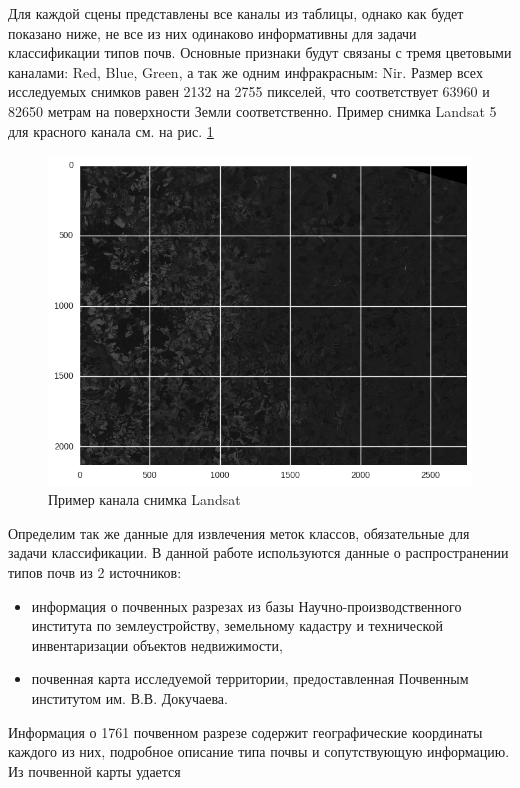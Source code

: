 \documentclass[14pt]{extarticle}
\begin{document}
\par
Для каждой сцены представлены все каналы из таблицы, однако как будет показано ниже, не 
все из них одинаково информативны для задачи классификации типов почв. Основные признаки
будут связаны с тремя цветовыми каналами: Red, Blue, Green, а так же одним инфракрасным: Nir.
Размер всех исследуемых снимков равен 2132 на 2755 пикселей, что соответствует
63960 и 82650 метрам на поверхности Земли соответственно. Пример снимка Landsat 5 для
красного канала см. на рис. \ref{image:landsat_example}
\begin{figure}[H]
\centering
\includegraphics[width=\linewidth]{imgs/landsat_example.png}
\caption{Пример канала снимка Landsat}
\label{image:landsat_example}
\end{figure}
\par
Определим так же данные для извлечения меток классов, обязательные для задачи классификации.
В данной работе используются данные о распространении типов почв из 2 источников:
\begin{itemize}
    \item информация о почвенных разрезах из базы Научно-производственного института по 
        землеустройству, земельному кадастру и технической инвентаризации объектов
        недвижимости,
    \item почвенная карта исследуемой территории, предоставленная Почвенным институтом
        им. В.В. Докучаева.
\end{itemize}
Информация о 1761 почвенном разрезе содержит географические координаты каждого из них,
подробное описание типа почвы и сопутствующую информацию. Из почвенной карты удается
\end{document}
